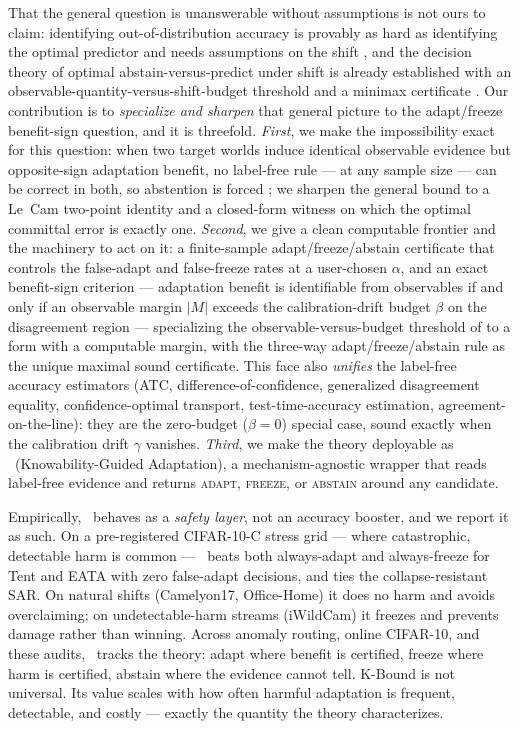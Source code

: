 That the general question is unanswerable without assumptions is not ours to claim:
identifying out-of-distribution accuracy is provably as hard as identifying the optimal
predictor and needs assumptions on the shift \cite{garg2022atc}, and the decision theory
of optimal abstain-versus-predict under shift is already established with an
observable-quantity-versus-shift-budget threshold and a minimax certificate
\cite{kalai2021abstain}. Our contribution is to \emph{specialize and sharpen} that
general picture to the adapt/freeze benefit-sign question, and it is threefold.
\emph{First}, we make the impossibility exact for this question: when two target worlds
induce identical observable evidence but opposite-sign adaptation benefit, no label-free
rule --- at any sample size --- can be correct in both, so abstention is forced
\cite{garg2022atc,kalai2021abstain}; we sharpen the general bound to a Le~Cam two-point
identity and a closed-form witness on which the optimal committal error is exactly one.
\emph{Second}, we give a clean computable frontier and the machinery to act on it: a
finite-sample adapt/freeze/abstain certificate that controls the false-adapt and
false-freeze rates at a user-chosen $\alpha$, and an exact benefit-sign criterion ---
adaptation benefit is identifiable from observables if and only if an observable margin
$|M|$ exceeds the calibration-drift budget $\beta$ on the disagreement region ---
specializing the observable-versus-budget threshold of \cite{kalai2021abstain} to a
form with a computable margin, with the three-way adapt/freeze/abstain rule as the
unique maximal sound certificate. This face also \emph{unifies} the label-free accuracy
estimators (ATC, difference-of-confidence, generalized disagreement equality,
confidence-optimal transport, test-time-accuracy estimation, agreement-on-the-line): they
are the zero-budget ($\beta=0$) special case, sound exactly when the calibration drift
$\gamma$ vanishes. \emph{Third}, we make the theory deployable as \KGA\
(Knowability-Guided Adaptation), a mechanism-agnostic wrapper that reads label-free
evidence and returns \textsc{adapt}, \textsc{freeze}, or \textsc{abstain} around any
candidate.

Empirically, \KGA\ behaves as a \emph{safety layer}, not an accuracy booster, and we
report it as such. On a pre-registered CIFAR-10-C stress grid --- where catastrophic,
detectable harm is common --- \KGA\ beats both always-adapt and always-freeze for
Tent and EATA with zero false-adapt decisions, and ties the collapse-resistant SAR.
On natural shifts (Camelyon17, Office-Home) it does no harm and avoids overclaiming;
on undetectable-harm streams (iWildCam) it freezes and prevents damage rather than
winning. Across anomaly routing, online CIFAR-10, and these audits, \KGA\ tracks the
theory: adapt where benefit is certified, freeze where harm is certified, abstain
where the evidence cannot tell. K-Bound is not universal. Its value scales with how
often harmful adaptation is frequent, detectable, and costly --- exactly the quantity
the theory characterizes.

